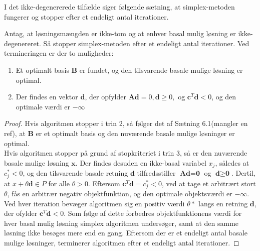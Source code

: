 I det ikke-degenererede tilfælde siger følgende sætning, at simplex-metoden fungerer og stopper efter et endeligt antal iterationer.
\begin{thm}{}{}
Antag, at løsningsmængden er ikke-tom og at enhver basal mulig løsning er ikke-degenereret.
Så stopper simplex-metoden efter et endeligt antal iterationer. 
Ved termineringen er der to muligheder:
\begin{enumerate}[label = (\alph*)]
\item Et optimalt basis $\textbf{B}$ er fundet, og den tilsvarende basale mulige løsning er optimal.
\item Der findes en vektor $\textbf{d}$, der opfylder $\textbf{Ad}=0,\textbf{d}\geq 0,$ og $\textbf{c}^T\textbf{d}<0$, og den optimale værdi er $-\infty$
\end{enumerate}
\end{thm}
%
\begin{proof}
Hvis algoritmen stopper i trin 2, så følger det af Sætning 6.1(mangler en ref), at $\textbf{B}$ er et optimalt basis og den nuværende basale mulige løsninger er optimal.
\\
Hvis algoritmen stopper på grund af stopkriteriet i trin $3$, så er den nuværende basale mulige løsning $\textbf{x}$. 
Der findes desuden en ikke-basal variabel $x_j$, således at $c^*_j<0$, og den tilsvarende basale retning $\textbf{d}$ tilfredsstiller $\textbf{Ad}=\textbf{0}$ og $\textbf{d} \geq \textbf{0}$. 
Dertil, at $x+\theta \textbf{d}\in P$ for alle $\theta>0$. 
Eftersom $\textbf{c}^T\textbf{d}=c_j^*<0$, ved at tage et arbitrært stort $\theta$, fås en arbitrær negativ objektfunktion, og den optimale objektsværdi er $-\infty$.
\\
Ved hver iteration bevæger algoritmen sig en positiv værdi $\theta*$ langs en retning $\textbf{d}$, der ofylder $\textbf{c}^T\textbf{d}<0$. 
Som følge af dette forbedres objektfunktionens værdi for hver basal mulig løsning simplex algoritmen undersøger, samt at den samme løsning ikke besøges mere end en gang. 
Eftersom der er et endeligt antal basale mulige løsninger, terminerer algoritmen efter et endeligt antal iterationer.
\end{proof}
%
